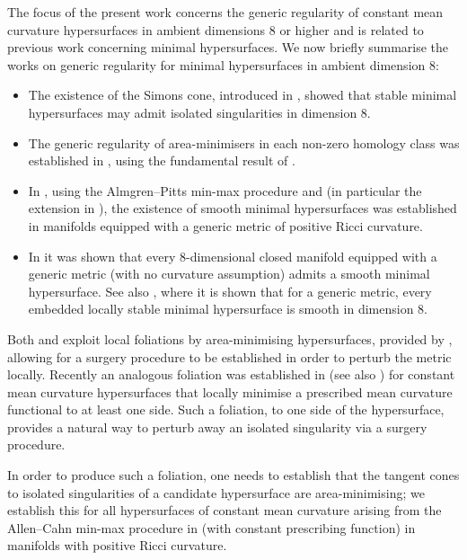 \documentclass[11pt]{article}
\begin{document}
The focus of the present work concerns the generic regularity of constant mean curvature hypersurfaces in ambient dimensions $8$ or higher and is related to previous work concerning minimal hypersurfaces. We now briefly summarise the works on generic regularity for minimal hypersurfaces in ambient dimension $8$:
\begin{itemize}
    \item The existence of the Simons cone, introduced in \cite{Simons68}, showed that stable minimal hypersurfaces may admit isolated singularities in dimension $8$. 
    
    \item The generic regularity of area-minimisers in each non-zero homology class was established in \cite{Smale}, using the fundamental result of \cite{hardt-simon}.

    \item In \cite{C-L-S}, using the Almgren--Pitts min-max procedure and \cite{hardt-simon} (in particular the extension in \cite{liu}), the existence of smooth minimal hypersurfaces was established in manifolds equipped with a generic metric of positive Ricci curvature.

    \item In \cite{li-wang21} it was shown that every $8$-dimensional closed manifold equipped with a generic metric (with no curvature assumption) admits a smooth minimal hypersurface. See also \cite{li-wang22}, where it is shown that for a generic metric, every embedded locally stable minimal hypersurface is smooth in dimension $8$.
\end{itemize}

Both \cite{Smale} and \cite{C-L-S} exploit local foliations by area-minimising hypersurfaces, provided by \cite{hardt-simon}, allowing for a surgery procedure to be established in order to perturb the metric locally. Recently an analogous foliation was established in \cite{Kostas23} (see also \cite{BL24}) for constant mean curvature hypersurfaces that locally minimise a prescribed mean curvature functional to at least one side. Such a foliation, to one side of the hypersurface, provides a natural way to perturb away an isolated singularity via a surgery procedure.

\bigskip

In order to produce such a foliation, one needs to establish that the tangent cones to isolated singularities of a candidate hypersurface are area-minimising; we establish this for all hypersurfaces of constant mean curvature arising from the Allen--Cahn min-max procedure in \cite{bellettini-wickramasekera} (with constant prescribing function) in manifolds with positive Ricci curvature.
\end{document}
